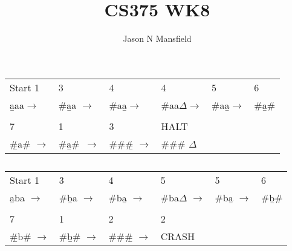 \documentclass[12pt]{article}
\begin{document}
\title{CS375 WK8}
\author{Jason N Mansfield}
\maketitle
\section{}
\subsection{}

\begin{tabular}{ l l l l l l }  
  Start 1&3&4&4&5&6           \\         
\b{a}aa$\rightarrow$ & \#\b{a}a $\rightarrow$&\#a\b{a}$\rightarrow$ & \#aa\b{$\Delta$}$\rightarrow$& \#a\b{a}$\rightarrow$&\#\b{a}\#\\
&&&&&\\%
7&1&3&HALT&&\\
\b{\#}a\# $\rightarrow$&\#\b{a}\#\ $\rightarrow$&\#\#\b{\#} $\rightarrow$ & \#\#\# \b{$\Delta$} &&\\
\end{tabular}

\subsection{}
\begin{tabular}{l l l l l l}
Start 1& 3 & 4 & 5 & 5 & 6\\
\b{a}ba $\rightarrow$& \#\b{b}a $\rightarrow$& \#b\b{a} $\rightarrow$ & \#ba\b{$\Delta$} $\rightarrow$ & \#b\b{a} $\rightarrow$& \#\b{b}\# \\
&&&&&\\
7&1& 2 &2&&\\
\b{\#}b\# $\rightarrow$& \#\b{b}\# $\rightarrow$& \#\#\b{\#} $\rightarrow$&CRASH&&
\end{tabular}
\end{document}
